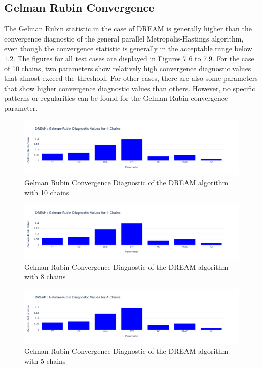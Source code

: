 \subsection{Gelman Rubin Convergence}
The Gelman Rubin statistic in the case of DREAM is generally higher than the convergence diagnostic of the general parallel Metropolis-Hastings algorithm, even though the convergence statistic is generally in the acceptable range below $1.2$. The figures for all test cases are displayed in Figures 7.6 to 7.9. For the case of 10 chains, two parameters show relatively high convergence diagnostic values that almost exceed the threshold. For other cases, there are also some parameters that show higher convergence diagnostic values than others. However, no specific patterns or regularities can be found for the Gelman-Rubin convergence parameter. 

\begin{figure}[H]
    \centering
    \includegraphics[width=1\textwidth]{figures/dream/gr_10.png}
    \captionsetup{width=.8\textwidth}
    \caption{Gelman Rubin Convergence Diagnostic of the DREAM algorithm with 10 chains}
    \label{fig:enter-label}
\end{figure}

\begin{figure}[H]
    \centering
    \includegraphics[width=1\textwidth]{figures/dream/gr_8.png}
    \captionsetup{width=.8\textwidth}
    \caption{Gelman Rubin Convergence Diagnostic of the DREAM algorithm with 8 chains}
    \label{fig:enter-label}
\end{figure}

\begin{figure}[H]
    \centering
    \includegraphics[width=1\textwidth]{figures/dream/gr_5.png}
    \captionsetup{width=.8\textwidth}
    \caption{Gelman Rubin Convergence Diagnostic of the DREAM algorithm with 5 chains}
    \label{fig:enter-label}
\end{figure}

